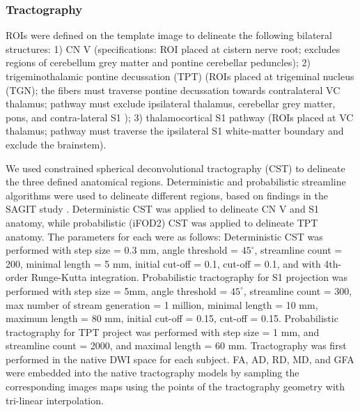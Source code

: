 \subsubsection{Tractography}
ROIs were defined on the template image to delineate the following bilateral structures: 1) CN V (specifications: ROI placed at cistern nerve root; excludes regions of cerebellum grey matter and pontine cerebellar peduncles); 2) trigeminothalamic pontine decussation (TPT) (ROIs placed at trigeminal nucleus (TGN); the fibers must traverse pontine decussation towards contralateral VC thalamus; pathway must exclude ipsilateral thalamus, cerebellar grey matter, pons, and contra-lateral S1 ); 3) thalamocortical S1 pathway (ROIs placed at VC thalamus; pathway must traverse the ipsilateral S1 white-matter boundary and exclude the brainstem).  

We used constrained spherical deconvolutional tractography (CST) \cite{Tournier2012b} to delineate the three defined anatomical regions. Deterministic and probabilistic streamline algorithms were used to delineate different regions, based on findings in the SAGIT study \cite{Chen2016}. Deterministic CST was applied to delineate CN V and S1 anatomy, while probabilistic (iFOD2) CST \cite{Jeurissen2011b,Tournier2010} was applied to delineate TPT anatomy. The parameters for each were as follows: Deterministic CST was performed with step size = 0.3 mm, angle threshold = $45^\circ$, streamline count = 200, minimal length = 5 mm, initial cut-off = 0.1, cut-off = 0.1, and with 4th-order Runge-Kutta integration. Probabilistic tractography for S1 projection was performed with step size = 5mm, angle threshold = $45^\circ$, streamline count = 300, max number of stream generation = 1 million, minimal length = 10 mm, maximum length = 80 mm, initial cut-off = 0.15, cut-off = 0.15. Probabilistic tractography for TPT project was performed with step size = 1 mm, and streamline count = 2000, and maximal length = 60 mm. Tractography was first performed in the native DWI space for each subject.  FA, AD, RD, MD, and GFA were embedded into the native tractography models by sampling the corresponding images maps using the points of the tractography geometry with tri-linear interpolation.

